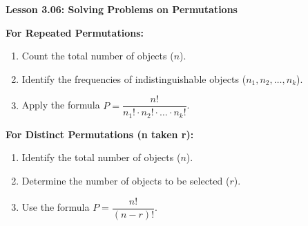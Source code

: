 \begin{center}
\textbf{Lesson 3.06: Solving Problems on Permutations}
\end{center}

\vspace*{-1.5ex}


\noindent \textbf{For Repeated Permutations:}
\begin{enumerate}
    \item Count the total number of objects (\(n\)).
    \item Identify the frequencies of indistinguishable objects (\(n_1, n_2, \ldots, n_k\)).
    \item Apply the formula \(P = \dfrac{n!}{n_1! \cdot n_2! \cdot \ldots \cdot n_k!}\).
\end{enumerate}

\noindent \textbf{For Distinct Permutations (n taken r):}
\begin{enumerate}
    \item Identify the total number of objects (\(n\)).
    \item Determine the number of objects to be selected (\(r\)).
    \item Use the formula \(P = \dfrac{n!}{(n-r)!}\).
\end{enumerate}
